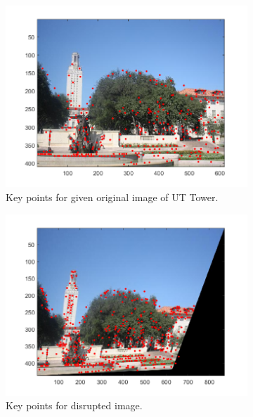 \documentclass{article}
\begin{document}
\newpage

\begin{figure}[!htb]
\begin{subfigure}{.5\textwidth}
  \centering
  \includegraphics[width=.99\textwidth]{uttower2_keypoints.png}
  \caption{Key points for given original image of UT Tower.}
\end{subfigure}%
\begin{subfigure}{.5\textwidth}
  \centering
  \includegraphics[width=.99\textwidth]{uttower2_bad_keypoints.png}
  \caption{Key points for disrupted image.}
\end{subfigure}
\begin{subfigure}{.9\textwidth}
  \centering

\end{subfigure}
\end{figure}
\end{document}
